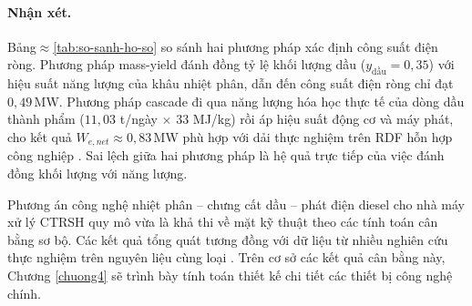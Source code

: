 \documentclass[../main.tex]{subfiles}
\begin{document}
\begin{table}[htbp]
\centering
\caption{Đối chiếu kết quả tính toán giữa hai phương pháp cascade (cũ và mới)}
\label{tab:so-sanh-ho-so}
\setlength{\tabcolsep}{5pt}
\end{table}

\paragraph*{Nhận xét.} Bảng$\approx$\ref{tab:so-sanh-ho-so} so sánh hai phương pháp xác định công suất điện ròng. Phương pháp mass-yield đánh đồng tỷ lệ khối lượng dầu ($y_{\text{dầu}}=0{,}35$) với hiệu suất năng lượng của khâu nhiệt phân, dẫn đến công suất điện ròng chỉ đạt $0{,}49$\,MW. Phương pháp cascade đi qua năng lượng hóa học thực tế của dòng dầu thành phẩm ($11{,}03$ t/ngày $\times$ 33 MJ/kg) rồi áp hiệu suất động cơ và máy phát, cho kết quả $W_{e,net} \approx 0{,}83$\,MW phù hợp với dải thực nghiệm trên RDF hỗn hợp công nghiệp \cite{Sharuddin2016,Miandad2016,Williams2007}. Sai lệch giữa hai phương pháp là hệ quả trực tiếp của việc đánh đồng khối lượng với năng lượng.

Phương án công nghệ nhiệt phân -- chưng cất dầu -- phát điện diesel cho nhà máy xử lý CTRSH quy mô vừa là khả thi về mặt kỹ thuật theo các tính toán cân bằng sơ bộ. Các kết quả tổng quát tương đồng với dữ liệu từ nhiều nghiên cứu thực nghiệm trên nguyên liệu cùng loại \cite{Sharuddin2016,Williams2007,Miandad2016,Arena2012}. Trên cơ sở các kết quả cân bằng này, Chương \ref{chuong4} sẽ trình bày tính toán thiết kế chi tiết các thiết bị công nghệ chính.
\end{document}
